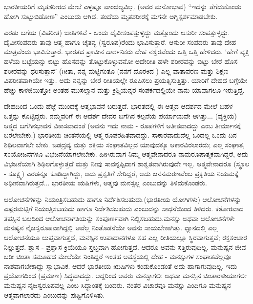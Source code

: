 ಭಾರತೀಯರಿಗೆ ಮೃತಶರೀರದ ಮೇಲೆ ಎಳ್ಳಷ್ಟೂ ವಾಂಛಲ್ಯವಿಲ್ಲ. (ಅವರ ಮನೋಭಾವ) “ಇದನ್ನು ತೆಗೆದುಕೊಂಡು ಹೋಗಿ ಸುಟ್ಟುಬಿಡೋಣ'' ಎಂಬುದು ಆಗಿದೆ. ತಂದೆಯ ಮೃತಶರೀರಕ್ಕೆ ಮಗನೇ ಅಗ್ನಿಸ್ಪರ್ಶಮಾಡಬೇಕು.

ಎರಡು ಬಗೆಯ (ವಿಪರೀತ) ಜಾತಿಗಳಿವೆ - ಒಂದು ದೈವೀಸಂಪತ್ತುಳ್ಳದ್ದು ಮತ್ತೊಂದು ಆಸುರೀ ಸಂಪತ್ತುಳ್ಳದ್ದು. ದೈವೀಸಂಪದರು ತಾವು ಆತ್ಮ ಹಾಗೂ ಚೈತನ್ಯ (ಸ್ವರೂಪ)ರೆಂದು ಭಾವಿಸುತ್ತಾರೆ. ಆಸುರೀ ಸಂಪದರು ತಾವು ದೇಹ ಮಾತ್ರವೆಂದು ಭಾವಿಸುತ್ತಾರೆ. ಭಾರತದ ಪ್ರಾಚೀನ ದಾರ್ಶನಿಕರು ದೇಹ ನಶ್ವರವೆಂದು ಒತ್ತಿ ಒತ್ತಿ ಹೇಳಿದರು. `ಹೇಗೆ ವ್ಯಕ್ತಿ ಹಳೆಯ ಬಟ್ಟೆಯನ್ನು ಬಿಟ್ಟು ಹೊಸದನ್ನು ತೊಟ್ಟುಕೊಳ್ಳುವನೋ ಅದೇರೀತಿ ಹಳೇ ಶರೀರವನ್ನು ಬಿಟ್ಟು ಬೇರೆ ಹೊಸ ಶರೀರವನ್ನು ಧರಿಸುತ್ತಾನೆ' (ಗೀತಾ,  ನನ್ನ ಮಟ್ಟಿಗಂತೂ (ನನಗೆ ದೊರಕಿದ ) ಎಲ್ಲ ವಾತಾವರಣ ಮತ್ತು ಶಿಕ್ಷಣ ವಿಪರೀತವಾಗಿಯೇ ಇತ್ತು. ಅದು ನನ್ನನ್ನು ಬೇರೆ ರೀತಿಯಲ್ಲೇ ರೂಪಿಸಲು ಪ್ರಯತ್ನಿಸುತ್ತಿತ್ತು. ಯಾರಿಗೆ ದೇಹದ ಬಗ್ಗೆಯೇ ಹೆಚ್ಚು ಕಾಳಜಿಯಿತ್ತೋ ಅಂತಹ ಮುಸಲ್ಮಾನ ಮತ್ತು ಕ್ರಿಶ್ಚಿಯನ್ನರ ಸಂಪರ್ಕದಲ್ಲಿಯೇ ನಾನು ಯಾವಾಗಲೂ ಇರುತ್ತಿದ್ದೆ.

ದೇಹದಿಂದ ಒಂದು ಹೆಜ್ಜೆ ಮುಂದಕ್ಕೆ ಆತ್ಮಭಾವನೆ ಬರುತ್ತದೆ. ಭಾರತದಲ್ಲಿ ಈ ಆತ್ಮದ ಆದರ್ಶದ ಮೇಲೆ ಬಹಳ ಒತ್ತನ್ನು ಕೊಟ್ಟಿದ್ದರು. ನಮ್ಮವರಿಗೆ ಈ ಆದರ್ಶ ದೇವರ ಬಗೆಗಿನ ಕಲ್ಪನೆಯ ಪರ್ಯಾಯವೇ ಆಗಿತ್ತು... (ವ್ಯಕ್ತಿಯ) ಆತ್ಮದ ಬಗೆಗಿನ\break ಭಾವನೆ ವಿಕಾಸವಾದಂತೆ (ಅವನು ಇದು ನಾಮ - ರೂಪಗಳಿಗೆ ಅತೀತವಾದದ್ದು ಎಂಬ ತೀರ್ಮಾನಕ್ಕೆ ಬರಲೇಬೇಕು.) ಭಾರತೀಯ ಚಿಂತನೆಯಲ್ಲಿ ಆತ್ಮ ರೂಪರಹಿತವಾದದ್ದು. ಸಾಕಾರವಾದುದೆಲ್ಲ ಒಂದಲ್ಲ ಒಂದು ದಿನ ಶಿಥಿಲವಾಗಲೇ ಬೇಕು. ಜಡದ್ರವ್ಯ ಮತ್ತು ಶಕ್ತಿಯ ಸಂಘಾತವಿಲ್ಲದ ಯಾವುದಕ್ಕೂ ಆಕಾರವಿರಲಾರದು; ಎಲ್ಲ ಸಂಘಾತ, ಸಂಯೋಜನೆಗಳೂ ವಿಭಜನೆಯಾಗಲೇಬೇಕು. ಹೀಗಿರುವಾಗ ನಿಮ್ಮ ಆತ್ಮವೇನಾದರೂ ನಾಮರೂಪಾತ್ಮಕವಾಗಿದ್ದರೆ, ಅದು ವಿಭಜನೆಯಾಗಿ ಶಿಥಿಲಗೊಳ್ಳುತ್ತದೆ ಮತ್ತು ನೀವು ಸಾವನ್ನಪ್ಪಿದಾಗ ಶಾಶ್ವತವಾಗಿರುವುದೇ ಇಲ್ಲ. ಆತ್ಮವೇನಾದರೂ (ಸ್ಥೂಲ - ಸೂಕ್ಷ್ಮ) ಎರಡನ್ನೂ ಕೂಡಿದ್ದಾಗಿದ್ದು, ಅದು ಪ್ರಕೃತಿಗೆ ಸೇರಿದ್ದರೆ, ಅದು ಜನನಮರಣವೆಂಬ ಪ್ರಕೃತಿಯ ನಿಯಮಕ್ಕೆ ಅಧೀನವಾಗಿರುತ್ತದೆ... ಭಾರತೀಯ ಋಷಿಗಳು, ಆತ್ಮವು ಮನಸ್ಸಲ್ಲ ಎಂಬುದನ್ನು ತಿಳಿದುಕೊಂಡರು.

ಆಲೋಚನೆಗಳನ್ನು ನಿಯಂತ್ರಿಸಬಹುದು ಹಾಗೂ ನಿರ್ದೆಶಿಸಬಹುದು.\break (ಭಾರತೀಯ ಯೋಗಿಗಳು) ಆಲೋಚನೆಗಳನ್ನು ಎಷ್ಟರಮಟ್ಟಿಗೆ ನಿಯಂತ್ರಿಸಬಹುದು ಹಾಗೂ ನಿರ್ದೆಶಿಸಬಹುದು ಎಂಬುದನ್ನು ಸಾಧನೆಯಿಂದ ತಿಳಿದರು. ಕಠೋರವಾದ ತಪಸ್ಸಿನ ಬಲದಿಂದ ಆಲೋಚನಾಗತಿಯನ್ನು ಸಂಪೂರ್ಣವಾಗಿ ನಿಲ್ಲಿಸಬಹುದು.\break ಮನಸ್ಸು ಅಥವಾ ಆಲೋಚನೆಗಳೇ ಮನಷ್ಯನ ನೈಜಸ್ವರೂಪವಾಗಿದ್ದಲ್ಲಿ ಅವೆಲ್ಲ ನಿಂತೊಡನೆಯೇ ಅವನು ಸಾಯಬೇಕಾಗಿತ್ತು. ಧ್ಯಾನದಲ್ಲಿ ಎಲ್ಲ ಆಲೋಚನೆಯೂ ಲುಪ್ತವಾಗುತ್ತದೆ, ಮನಸ್ಸಿನ ಉಪಾದಾನಗಳೂ ಸಹ ಎಲ್ಲ ರೀತಿಯಲ್ಲೂ ಸ್ಥಿರವಾಗುತ್ತವೆ; ರಕ್ತಸಂಚಾರ ನಿಲ್ಲುತ್ತದೆ. ಶ್ವಾಸ - ಪ್ರಶ್ವಾಸ ಕ್ರಿಯೆಯೂ ಸ್ತಬ್ದವಾಗಿ ಹೋಗುತ್ತದೆ. ಆದರೂ ಅವನು ಸತ್ತಿರುವುದಿಲ್ಲ. ಮನುಷ್ಯನ ಜೀವ ಬರೀ ಚಿಂತಾ ಸಮೂಹದ ಮೇಲೆಯೇ ನಿಂತಿದ್ದರೆ ಇಂತಹ ಅವಸ್ಥೆಯಲ್ಲಿ ದೇಹ - ಮನಸ್ಸುಗಳ ಸಂಘಾತವೆಲ್ಲವೂ ನಾಶವಾಗಬೇಕಾದ್ದು ಸ್ವಾಭಾವಿಕ. ಆದರೆ ಭಾರತೀಯ ಋಷಿಗಳು ಕಂಡುಕೊಂಡಂತೆ ಅದು ಹಾಗಾಗುವುದಿಲ್ಲ. ಇದು ಪ್ರಯೋಗದಿಂದ (ಪ್ರಮಾಣ) ಸಿದ್ಧವಾದದ್ದು. ಆದ್ದರಿಂದ ಅವರು ಮನಸ್ಸಾಗಲೀ ಅಥವಾ ಮನಸ್ಸಿನ ಚಿಂತಾರಾಶಿಯಾಗಲೀ ಮನುಷ್ಯನ ನೈಜಸ್ವರೂಪವಲ್ಲ ಎಂಬ ಸಿದ್ಧಾಂತಕ್ಕೆ ಬಂದರು. ನಂತರ ವಿಚಾರವೂ ಮನಸ್ಸು ಎಂದಿಗೂ ಮನುಷ್ಯನ ಆತ್ಮವಾಗಲಾರದು ಎಂಬುದನ್ನು ಪುಷ್ಟಿಗೊಳಿಸಿತು.

